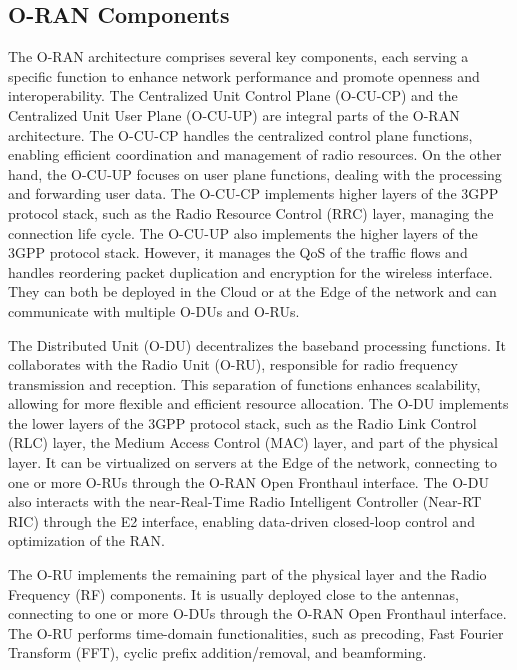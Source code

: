 \subsection{O-RAN Components}\label{subsec:components}
The O-RAN architecture comprises several key components, each serving a specific function to enhance network performance and promote openness and interoperability.
The Centralized Unit Control Plane (O-CU-CP) and the Centralized Unit User Plane (O-CU-UP) are integral parts of the O-RAN architecture.
The O-CU-CP handles the centralized control plane functions, enabling efficient coordination and management of radio resources.
On the other hand, the O-CU-UP focuses on user plane functions, dealing with the processing and forwarding user data.
The O-CU-CP implements higher layers of the 3GPP protocol stack, such as the Radio Resource Control (RRC) layer, managing the connection life cycle.
The O-CU-UP also implements the higher layers of the 3GPP protocol stack.
However, it manages the QoS of the traffic flows and handles reordering packet duplication and encryption for the wireless interface.
They can both be deployed in the Cloud or at the Edge of the network and can communicate with multiple O-DUs and O-RUs.

The Distributed Unit (O-DU) decentralizes the baseband processing functions.
It collaborates with the Radio Unit (O-RU), responsible for radio frequency transmission and reception.
This separation of functions enhances scalability, allowing for more flexible and efficient resource allocation.
The O-DU implements the lower layers of the 3GPP protocol stack, such as the Radio Link Control (RLC) layer, the Medium Access Control (MAC) layer, and part of the physical layer.
It can be virtualized on servers at the Edge of the network, connecting to one or more O-RUs through the O-RAN Open Fronthaul interface.
The O-DU also interacts with the near-Real-Time Radio Intelligent Controller (Near-RT RIC) through the E2 interface, enabling data-driven closed-loop control and optimization of the RAN\@.

The O-RU implements the remaining part of the physical layer and the Radio Frequency (RF) components.
It is usually deployed close to the antennas, connecting to one or more O-DUs through the O-RAN Open Fronthaul interface.
The O-RU performs time-domain functionalities, such as precoding, Fast Fourier Transform (FFT), cyclic prefix addition/removal, and beamforming.

